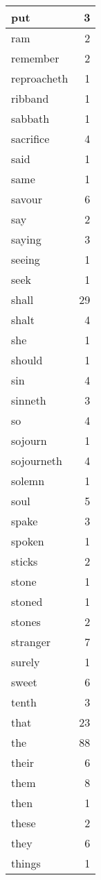 \begin{center}
\begin{longtable}{l|r}
put & 3 \\ \hline
ram & 2 \\ \hline
remember & 2 \\ \hline
reproacheth & 1 \\ \hline
ribband & 1 \\ \hline
sabbath & 1 \\ \hline
sacrifice & 4 \\ \hline
said & 1 \\ \hline
same & 1 \\ \hline
savour & 6 \\ \hline
say & 2 \\ \hline
saying & 3 \\ \hline
seeing & 1 \\ \hline
seek & 1 \\ \hline
shall & 29 \\ \hline
shalt & 4 \\ \hline
she & 1 \\ \hline
should & 1 \\ \hline
sin & 4 \\ \hline
sinneth & 3 \\ \hline
so & 4 \\ \hline
sojourn & 1 \\ \hline
sojourneth & 4 \\ \hline
solemn & 1 \\ \hline
soul & 5 \\ \hline
spake & 3 \\ \hline
spoken & 1 \\ \hline
sticks & 2 \\ \hline
stone & 1 \\ \hline
stoned & 1 \\ \hline
stones & 2 \\ \hline
stranger & 7 \\ \hline
surely & 1 \\ \hline
sweet & 6 \\ \hline
tenth & 3 \\ \hline
that & 23 \\ \hline
the & 88 \\ \hline
their & 6 \\ \hline
them & 8 \\ \hline
then & 1 \\ \hline
these & 2 \\ \hline
they & 6 \\ \hline
things & 1 \\ \hline

\end{longtable}
\end{center}
